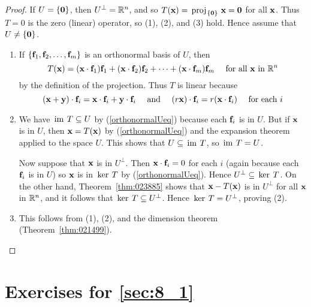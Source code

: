 \begin{proof}
If $U = \{\textbf{0}\}$, then $U^\perp = \mathbb{R}^n$, and so $T(\textbf{x}) = \thinspace\operatorname{proj\medspace}_{\!\{\textbf{0}\}}\,{\textbf{x}} = \textbf{0}$ for all $\textbf{x}$. Thus $T = 0$ is the zero (linear) operator, so (1), (2), and (3) hold. Hence assume that $U \neq \{\textbf{0}\}$.

\begin{enumerate}
\item If $\{\textbf{f}_{1}, \textbf{f}_{2}, \dots, \textbf{f}_{m}\}$ is an orthonormal basis of $U$, then
\begin{equation} \label{orthonormalUeq}
T(\textbf{x}) = (\textbf{x} \cdot \textbf{f}_{1})\textbf{f}_{1} + (\textbf{x} \cdot \textbf{f}_{2})\textbf{f}_{2} + \dots + (\textbf{x} \cdot \textbf{f}_{m})\textbf{f}_{m} \quad \mbox{ for all }\textbf{x} \mbox{ in } \mathbb{R}^n
\end{equation}
by the definition of the projection. Thus $T$ is linear because
\begin{equation*}
(\textbf{x} + \textbf{y}) \cdot \textbf{f}_{i} = \textbf{x} \cdot \textbf{f}_{i} + \textbf{y} \cdot \textbf{f}_{i} \quad \mbox{ and } \quad (r\textbf{x}) \cdot \textbf{f}_{i} = r(\textbf{x} \cdot \textbf{f}_{i}) \quad \mbox{ for each } i
\end{equation*}
\item We have $\thinspace\operatorname{im \medspace}T \subseteq U$ by (\ref{orthonormalUeq}) because each $\textbf{f}_{i}$ is in $U$. But if $\textbf{x}$ is in $U$, then $\textbf{x} = T(\textbf{x})$ by (\ref{orthonormalUeq}) and the expansion theorem applied to the space $U$. This shows that $U \subseteq \thinspace\operatorname{im \medspace}T$, so $\thinspace\operatorname{im \medspace}T = U$.


Now suppose that $\textbf{x}$ is in $U^\perp$. Then $\textbf{x} \cdot \textbf{f}_{i} = 0$ for each $i$ (again because each $\textbf{f}_{i}$ is in $U$) so $\textbf{x}$ is in $\thinspace\operatorname{ker\medspace}T$ by (\ref{orthonormalUeq}). Hence $U^\perp \subseteq \thinspace\operatorname{ker\medspace} T$. On the other hand, Theorem~\ref{thm:023885} shows that $\textbf{x} - T(\textbf{x})$ is in $U^\perp$ for all $\textbf{x}$ in $\mathbb{R}^n$, and it follows that $\thinspace\operatorname{ker\medspace}T \subseteq U^\perp$. Hence $\thinspace\operatorname{ker\medspace}T = U^\perp$, proving (2).

\item This follows from (1), (2), and the dimension theorem (Theorem~\ref{thm:021499}).
\end{enumerate}
\vspace*{-2em}\end{proof}

\section*{Exercises for \ref{sec:8_1}}

